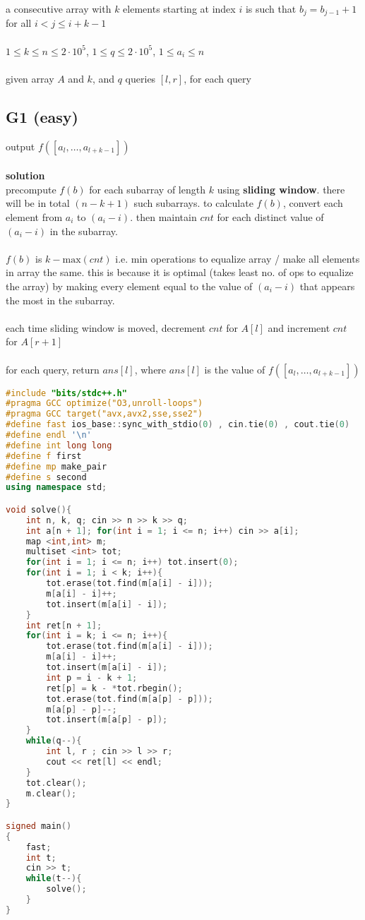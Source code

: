 \documentclass[11pt]{article}
\newcommand{\br}{\\\;\\} %
\newcommand{\soln}{\textbf{solution}\\}
\begin{document}
a consecutive array with $k$ elements starting at index $i$ is such that $b_{j} = b_{j-1} + 1$ for all $i < j \leq i + k - 1$\br

$1 \leq k \leq n \leq 2\cdot 10^{5}$, $1\leq q\leq 2\cdot 10^{5}$, $1\leq a_{i} \leq n$\br

given array $A$ and $k$, and $q$ queries $[l, r]$, for each query 
\subsection{G1 (easy)}
output $f([a_{l},\dots,a_{l+k-1}])$\br

\soln
precompute $f(b)$ for each subarray of length $k$ using \textbf{sliding window}. there will be in total $(n-k+1)$ such subarrays. to calculate $f(b)$, convert each element from $a_{i}$ to $(a_{i} - i)$. then maintain $cnt$ for each distinct value of $(a_{i} - i)$ in the subarray.\br

 $f(b)$ is $k - \text{max}(cnt)$ i.e. min operations to equalize array / make all elements in array the same. this is because it is optimal (takes least no. of ops to equalize the array) by making every element equal to the value of $(a_{i} -i)$ that appears the most in the subarray.\br
 
each time sliding window is moved, decrement $cnt$ for $A[l]$ and increment $cnt$ for $A[r+1]$\br

for each query, return $ans[l]$, where $ans[l]$ is the value of $f([a_{l},\dots,a_{l+k-1}])$
\begin{lstlisting}[language=C++]
#include "bits/stdc++.h"
#pragma GCC optimize("O3,unroll-loops")
#pragma GCC target("avx,avx2,sse,sse2")
#define fast ios_base::sync_with_stdio(0) , cin.tie(0) , cout.tie(0)
#define endl '\n'
#define int long long
#define f first
#define mp make_pair
#define s second
using namespace std;

void solve(){
    int n, k, q; cin >> n >> k >> q;
    int a[n + 1]; for(int i = 1; i <= n; i++) cin >> a[i];
    map <int,int> m;
    multiset <int> tot;
    for(int i = 1; i <= n; i++) tot.insert(0);
    for(int i = 1; i < k; i++){
        tot.erase(tot.find(m[a[i] - i]));
        m[a[i] - i]++;
        tot.insert(m[a[i] - i]);
    }
    int ret[n + 1];
    for(int i = k; i <= n; i++){
        tot.erase(tot.find(m[a[i] - i]));
        m[a[i] - i]++;
        tot.insert(m[a[i] - i]);
        int p = i - k + 1;
        ret[p] = k - *tot.rbegin();
        tot.erase(tot.find(m[a[p] - p]));
        m[a[p] - p]--;
        tot.insert(m[a[p] - p]);
    }
    while(q--){
        int l, r ; cin >> l >> r;
        cout << ret[l] << endl;
    }
    tot.clear();
    m.clear();
}

signed main()
{
    fast;
    int t;
    cin >> t;
    while(t--){
        solve();
    }
}
\end{lstlisting}
\end{document}
